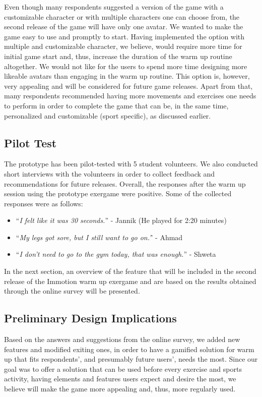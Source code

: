Even though many respondents suggested a version of the game with a customizable character or with multiple characters one can choose from, the second release of the game will have only one avatar. We wanted to make the game easy to use and promptly to start. Having implemented the option with multiple and customizable character, we believe, would require more time for initial game start and, thus, increase the duration of the warm up routine altogether. We would not like for the users to spend more time designing more likeable avatars than engaging in the warm up routine. This option is, however, very appealing and will be considered for future game releases. Apart from that, many respondents recommended having more movements and exercises one needs to perform in order to complete the game that can be, in the same time, personalized and customizable (sport specific), as discussed earlier.\pagebreak
\subsection{Pilot Test}
The prototype has been pilot-tested with 5 student volunteers. We also conducted short interviews with the volunteers in order to collect feedback and recommendations for future releases. Overall, the responses after the warm up session using the prototype exergame were positive. Some of the collected responses were as follows:
\begin{itemize}
\item ``\textit{I felt like it was 30 seconds.}'' - Jannik (He played for 2:20 minutes)
\item ``\textit{My legs got sore, but I still want to go on.'}' - Ahmad
\item ``\textit{I don't need to go to the gym today, that was enough.}'' - Shweta
\end{itemize}
In the next section, an overview of the feature that will be included in the second release of the Immotion warm up exergame and are based on the results obtained through the online survey will be presented.
\subsection{Preliminary Design Implications}
Based on the answers and suggestions from the online survey, we added new features and modified exiting ones, in order to have a gamified solution for warm up that fits respondents', and presumably future users', needs the most. Since our goal was to offer a solution that can be used before every exercise and sports activity, having elements and features users expect and desire the most, we believe will make the game more appealing and, thus, more regularly used. 
